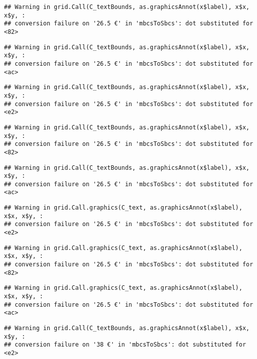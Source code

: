 \documentclass[
]{article}
\begin{document}
\begin{verbatim}
## Warning in grid.Call(C_textBounds, as.graphicsAnnot(x$label), x$x, x$y, :
## conversion failure on '26.5 €' in 'mbcsToSbcs': dot substituted for <82>
\end{verbatim}

\begin{verbatim}
## Warning in grid.Call(C_textBounds, as.graphicsAnnot(x$label), x$x, x$y, :
## conversion failure on '26.5 €' in 'mbcsToSbcs': dot substituted for <ac>
\end{verbatim}

\begin{verbatim}
## Warning in grid.Call(C_textBounds, as.graphicsAnnot(x$label), x$x, x$y, :
## conversion failure on '26.5 €' in 'mbcsToSbcs': dot substituted for <e2>
\end{verbatim}

\begin{verbatim}
## Warning in grid.Call(C_textBounds, as.graphicsAnnot(x$label), x$x, x$y, :
## conversion failure on '26.5 €' in 'mbcsToSbcs': dot substituted for <82>
\end{verbatim}

\begin{verbatim}
## Warning in grid.Call(C_textBounds, as.graphicsAnnot(x$label), x$x, x$y, :
## conversion failure on '26.5 €' in 'mbcsToSbcs': dot substituted for <ac>
\end{verbatim}

\begin{verbatim}
## Warning in grid.Call.graphics(C_text, as.graphicsAnnot(x$label), x$x, x$y, :
## conversion failure on '26.5 €' in 'mbcsToSbcs': dot substituted for <e2>
\end{verbatim}

\begin{verbatim}
## Warning in grid.Call.graphics(C_text, as.graphicsAnnot(x$label), x$x, x$y, :
## conversion failure on '26.5 €' in 'mbcsToSbcs': dot substituted for <82>
\end{verbatim}

\begin{verbatim}
## Warning in grid.Call.graphics(C_text, as.graphicsAnnot(x$label), x$x, x$y, :
## conversion failure on '26.5 €' in 'mbcsToSbcs': dot substituted for <ac>
\end{verbatim}

\begin{verbatim}
## Warning in grid.Call(C_textBounds, as.graphicsAnnot(x$label), x$x, x$y, :
## conversion failure on '38 €' in 'mbcsToSbcs': dot substituted for <e2>
\end{verbatim}
\end{document}
